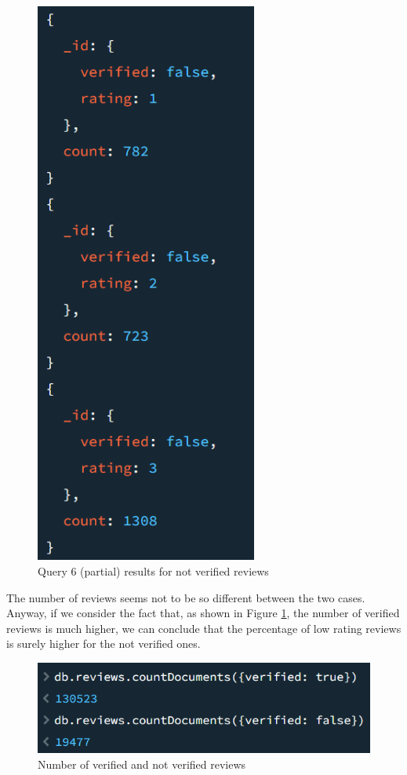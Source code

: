 \begin{figure}[H]
\begin{minipage}{0.45\textwidth}
      \includegraphics[width=0.65\textwidth]{Images/q6_result_2.png}
      \caption{Query 6 (partial) results for not verified reviews}
  \end{minipage}
\end{figure}
The number of reviews seems not to be so different between the two cases.
Anyway, if we consider the fact that, as shown in Figure \ref{fig:q6_result_spec}, the number of verified reviews is much higher, we can conclude that the percentage of low rating reviews is surely higher for the not verified ones. \\
\begin{figure}[H]
  \centering
  \includegraphics[scale=0.7]{Images/q6_result_spec.png}
  \caption{Number of verified and not verified reviews}
  \label{fig:q6_result_spec}
\end{figure}

